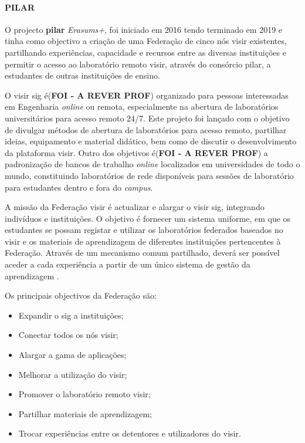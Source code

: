 \paragraph{PILAR}
O projecto \textbf{\acrfull{pilar}} \textit{Erasums+}, foi iniciado em 2016 tendo terminado em 2019 e tinha como objectivo a criação de uma Federação de cinco nós \acrshort{visir} existentes, partilhando experiências, capacidade e recursos entre as diversas instituições e permitir o acesso ao \acrshort{laboratório remoto} \acrshort{visir}, através do consórcio \acrshort{pilar}, a estudantes de outras instituições de ensino\cite{garcia-loro}.

O \acrshort{visir} \acrfull{sig} é(\textbf{FOI - A REVER PROF}) organizado para pessoas interessadas em Engenharia \textit{online} ou remota, especialmente na abertura de laboratórios universitários para acesso remoto 24/7. Este projeto foi lançado com o objetivo de divulgar métodos de abertura de laboratórios para acesso remoto,  partilhar ideias, equipamento e material didático, bem como de discutir o desenvolvimento da plataforma \acrshort{visir}. Outro dos objetivos é(\textbf{FOI - A REVER PROF}) a padronização de bancos de trabalho \textit{online} localizados em universidades de todo o mundo, constituindo laboratórios de rede disponíveis para sessões de laboratório para estudantes dentro e fora do \textit{campus}\cite{visirsig}.

A missão da Federação \acrshort{visir} é actualizar e alargar o \acrshort{visir} \acrshort{sig}, integrando indivíduos e instituições. O objetivo é fornecer um sistema uniforme, em que os estudantes se possam registar e utilizar os laboratórios federados baseados no \acrshort{visir} e os materiais de aprendizagem de diferentes instituições pertencentes à Federação. Através de um mecanismo comum partilhado, deverá ser possível aceder a cada experiência a partir de um único sistema de gestão da aprendizagem \cite{visirfederation}.

Os principais objectivos da Federação são\cite{visirfederation}:
\begin{itemize}
    \item Expandir o \acrshort{sig} a instituições;
    \item Conectar todos os nós \acrshort{visir};
    \item Alargar a gama de aplicações;
    \item Melhorar a utilização do \acrshort{visir};
    \item Promover o laboratório remoto \acrshort{visir};
    \item Partilhar materiais de aprendizagem;
    \item Trocar experiências entre os detentores e utilizadores do \acrshort{visir}.
\end{itemize}

